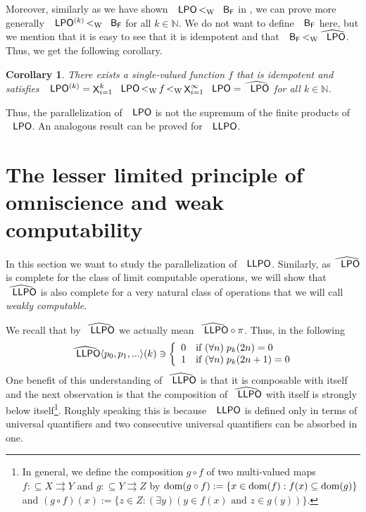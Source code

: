 \documentclass[jsl,10pt]{noasl}
\def\IN{{\mathbb{N}}}
\def\In{\subseteq}
\def\mto{\rightrightarrows}
\def\dom{{\rm dom}}
\def\LPO{\text{\rm\sffamily LPO}}
\def\LLPO{\text{\rm\sffamily LLPO}}
\def\BF{\text{\rm\sffamily B$_{\rm\mathsf F}$}}
\def\LPO{\text{\rm\sffamily LPO}}
\def\LLPO{\text{\rm\sffamily LLPO}}
\def\lW{\mathop{<_{\mathrm{W}}}}
\def\bigtimes{\mathop{\mathsf{X}}}
\newtheorem{corollary}[proposition]{Corollary}
\begin{document}
Moreover, similarly as we have shown $\LPO\lW\BF$ in \cite{BG09b},
we can prove more generally $\LPO^{(k)}\lW\BF$ for all $k\in\IN$. We do not want to define
$\BF$ here, but we mention that it is easy to see that it is idempotent and that $\BF\lW\widehat{\LPO}$.
Thus, we get the following corollary.

\begin{corollary}
\label{cor:LPO-product}
There exists a single-valued function $f$ that is idempotent and satisfies
$\LPO^{(k)}=\bigtimes_{i=1}^k\LPO\lW f\lW\bigtimes_{i=1}^\infty \LPO=\widehat{\LPO}$
for all $k\in\IN$.
\end{corollary} 

Thus, the parallelization of $\LPO$ is not the supremum of the finite products of $\LPO$.
An analogous result can be proved for $\LLPO$.


\section{The lesser limited principle of omniscience and weak computability}
\label{sec:LLPO}

In this section we want to study the parallelization of $\LLPO$.
Similarly, as $\widehat{\LPO}$ is complete for the class of limit
computable operations, we will show that $\widehat{\LLPO}$ is also
complete for a very natural class of operations that we will call {\em weakly computable}.

We recall that by $\widehat{\LLPO}$ we actually mean $\widehat{\LLPO}\circ\pi$.
Thus, in the following
\[\widehat{\LLPO}\langle p_0,p_1,...\rangle(k)\ni\left\{\begin{array}{ll}
  0 & \mbox{if $(\forall n)\;p_k(2n)=0$}\\
  1 & \mbox{if $(\forall n)\;p_k(2n+1)=0$}
\end{array}\right.\]
One benefit of this understanding of $\widehat{\LLPO}$ is that it is
composable with itself and
the next observation is that the composition of $\widehat{\LLPO}$ with itself
is strongly below itself\footnote{In general, we define the composition $g\circ f$ of two multi-valued 
maps $f:\In X\mto Y$ and $g:\In Y\mto Z$ by $\dom(g\circ f):=\{x\in\dom(f):f(x)\In\dom(g)\}$
and $(g\circ f)(x):=\{z\in Z:(\exists y)(y\in f(x)\mbox{ and }z\in g(y))\}$.}.
Roughly speaking this is because $\LLPO$ is defined
only in terms of universal quantifiers and two consecutive universal quantifiers 
can be absorbed in one.
\end{document}
